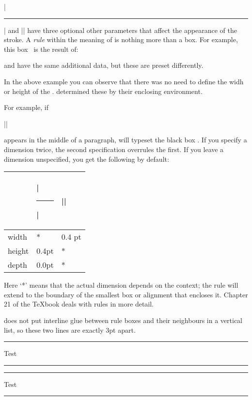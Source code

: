 \begin{teX}
\begin{teX}
\begin{teX}
\begin{teX}
\begin{teX}
\begin{teX}
|\hrule| and |\vrule| have three optional other parameters that affect the appearance
of the stroke. A \textit{rule} within the meaning of \tex  is nothing more than a
box. For example, this box \vrule height4pt width3pt depth1pt ~is the result of:

\begin{teX}
\vrule height4pt width3pt  depth1pt 
\end{teX}




 and  have the same additional data, but these are preset
differently.

{

\centering\scalebox{3}{\vrule\,Sample} \scalebox{3}{\vrule\,Subtle}

}

\begin{teX}
  \centering\scalebox{3}{\vrule ~Sample} \scalebox{3}{\vrule  ~Subtle}
\end{teX}

\noindent In the above example you can observe that there was no need to define the widh or height of the . \tex determined these by their enclosing environment.

For example, if

|\vrule height4pt width3pt depth2pt|

\def\smallbox{\vrule height4pt width3pt depth2pt}

\noindent appears in the middle of a paragraph, \tex will typeset the black box \smallbox. If you specify a dimension twice, the second specification overrules the first. If you leave a dimension unspecified, you get the following by default:

\begin{tabular}{lll}
\toprule
~     &|\hrule| &|\vrule|\\
\midrule
width &*        &0.4 pt\\
height&0.4pt    &*\\
depth &0.0pt    &*\\
\bottomrule
\end{tabular}
\medskip


Here `*' means that the actual dimension depends on the context; the rule will extend to the boundary of the smallest box or alignment that encloses it. Chapter 21 of the TeXbook deals with rules in more detail.

\tex does not put interline glue between rule boxes and their neighbours in a vertical list, so these two lines are exactly 3pt apart. 
\begin{teX}
\hrule width50pt Test \hrule width50pt
\vskip3pt
\hrule width50pt Test \hrule width50pt
\end{teX}


\end{teX}
\end{teX}
\end{teX}
\end{teX}
\end{teX}
\end{teX}
